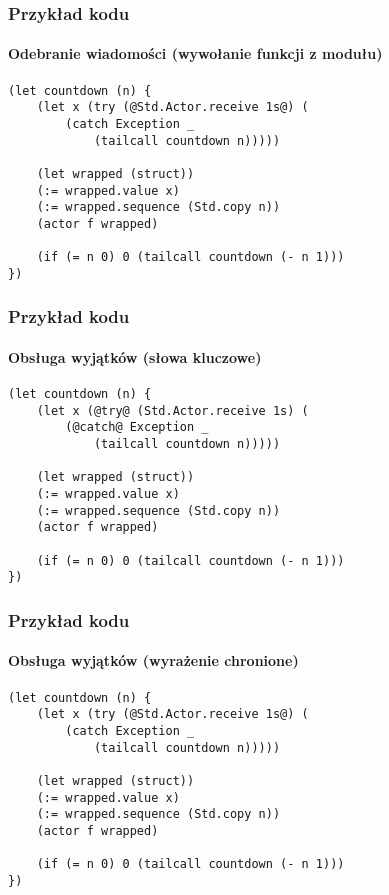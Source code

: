 \documentclass{beamer}
\begin{document}
\begin{frame}[fragile]
    \frametitle{Przykład kodu}
    \framesubtitle{Odebranie wiadomości (wywołanie funkcji z modułu)}

    \begin{small}
    \begin{lstlisting}
(let countdown (n) {
    (let x (try (@Std.Actor.receive 1s@) (
        (catch Exception _
            (tailcall countdown n)))))

    (let wrapped (struct))
    (:= wrapped.value x)
    (:= wrapped.sequence (Std.copy n))
    (actor f wrapped)

    (if (= n 0) 0 (tailcall countdown (- n 1)))
})
    \end{lstlisting}
    \end{small}
\end{frame}

\begin{frame}[fragile]
    \frametitle{Przykład kodu}
    \framesubtitle{Obsługa wyjątków (słowa kluczowe)}

    \begin{small}
    \begin{lstlisting}
(let countdown (n) {
    (let x (@try@ (Std.Actor.receive 1s) (
        (@catch@ Exception _
            (tailcall countdown n)))))

    (let wrapped (struct))
    (:= wrapped.value x)
    (:= wrapped.sequence (Std.copy n))
    (actor f wrapped)

    (if (= n 0) 0 (tailcall countdown (- n 1)))
})
    \end{lstlisting}
    \end{small}
\end{frame}

\begin{frame}[fragile]
    \frametitle{Przykład kodu}
    \framesubtitle{Obsługa wyjątków (wyrażenie chronione)}

    \begin{small}
    \begin{lstlisting}
(let countdown (n) {
    (let x (try (@Std.Actor.receive 1s@) (
        (catch Exception _
            (tailcall countdown n)))))

    (let wrapped (struct))
    (:= wrapped.value x)
    (:= wrapped.sequence (Std.copy n))
    (actor f wrapped)

    (if (= n 0) 0 (tailcall countdown (- n 1)))
})
    \end{lstlisting}
    \end{small}
\end{frame}
\end{document}
